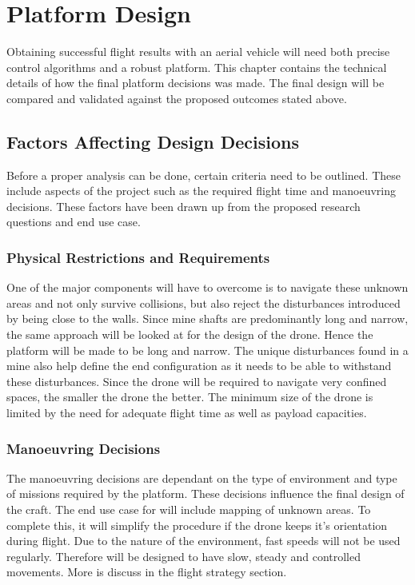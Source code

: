 \chapter{Platform Design}
Obtaining successful flight results with an aerial vehicle will need both precise control algorithms and a robust platform. This chapter contains the technical details of how the final platform decisions was made. The final design will be compared and validated against the proposed outcomes stated above. 

\section{Factors Affecting Design Decisions}
Before a proper analysis can be done, certain criteria need to be outlined. These include aspects of the project such as the required flight time and manoeuvring decisions. These factors have been drawn up from the proposed research questions and end use case.

\subsection{Physical Restrictions and Requirements}
One of the major components \projectName will have to overcome is to navigate these unknown areas and not only survive collisions, but also reject the disturbances introduced by being close to the walls. Since mine shafts are predominantly long and narrow, the same approach will be looked at for the design of the drone. Hence the platform will be made to be long and narrow. The unique disturbances found in a mine also help define the end configuration as it needs to be able to withstand these disturbances.
Since the drone will be required to navigate very confined spaces, the smaller the drone the better. The minimum size of the drone is limited by the need for adequate flight time as well as payload capacities.

\subsection{Manoeuvring Decisions}
The manoeuvring decisions are dependant on the type of environment and type of missions required by the platform. These decisions influence the final design of the craft.
The end use case for \projectName will include mapping of unknown areas. To complete this, it will simplify the procedure if the drone keeps it's orientation during flight. Due to the nature of the environment, fast speeds will not be used regularly. Therefore \projectName will be designed to have slow, steady and controlled movements. More is discuss in the flight strategy section.

